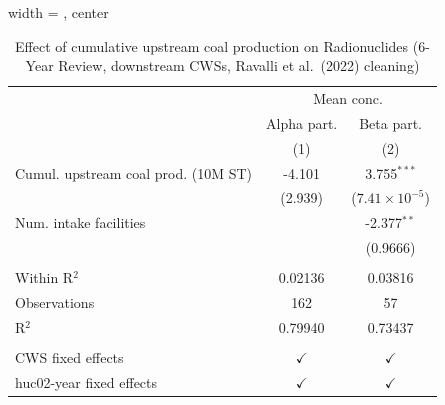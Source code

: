 
\begin{table}[htbp]
   
   \caption{\label{tab:6yr_huc02fe_radio_ravalli} Effect of cumulative upstream coal production on Radionuclides (6-Year Review, downstream CWSs, Ravalli et al.~(2022) cleaning)}
   \bigskip
   
   \centering
   
   \begin{adjustbox}{width = \textwidth, center}
      
      
      \begin{tabular}{lcc}
         \toprule
         
          & \multicolumn{2}{c}{Mean conc.}\\
         
                                             & Alpha part.   & Beta part. \\   
         
                                             & (1)           & (2)\\  
         
         \midrule 
         Cumul. upstream coal prod. (10M ST) & -4.101        & 3.755$^{***}$\\   
                                             & (2.939)       & ($7.41\times 10^{-5}$)\\    
         Num. intake facilities              &               & -2.377$^{**}$\\   
                                             &               & (0.9666)\\   
         
          \\
         
         Within R$^2$                        & 0.02136       & 0.03816\\  
         Observations                        & 162           & 57\\  
         R$^2$                               & 0.79940       & 0.73437\\  
         
          \\
         
         CWS fixed effects                   & $\checkmark$  & $\checkmark$\\   
         huc02-year fixed effects            & $\checkmark$  & $\checkmark$\\   
         

\end{tabular}
\end{adjustbox}
\end{table}
